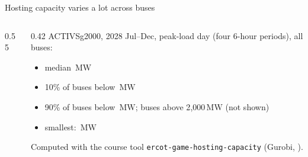 \documentclass[aspectratio=169,11pt]{beamer}
\newcommand{\HC}{\ensuremath{\mathrm{HC}}}
\newcommand{\MW}{\ensuremath{\,\mathrm{MW}}}
\begin{document}
\begin{frame}{Hosting capacity varies a lot across buses}
  \begin{columns}[T,onlytextwidth]
    \begin{column}{0.55\textwidth}
    \end{column}
    \begin{column}{0.42\textwidth}
      \small
      ACTIVSg2000, 2028 Jul--Dec, peak-load day (four 6-hour periods),
      all \HCbuses{} buses:
      \begin{itemize}
        \item median \HCmedian\MW
        \item 10\% of buses below \HCpten\MW
        \item 90\% of buses below \HCpninety\MW; \HCabove{} buses above 2{,}000\MW{} (not shown)
        \item smallest: \HCmin\MW
      \end{itemize}
      \vspace{0.3em}
      Computed with the course tool
      \texttt{ercot-game-hosting-capacity} (Gurobi, \HCruntime).
    \end{column}
  \end{columns}
\end{frame}
\end{document}
